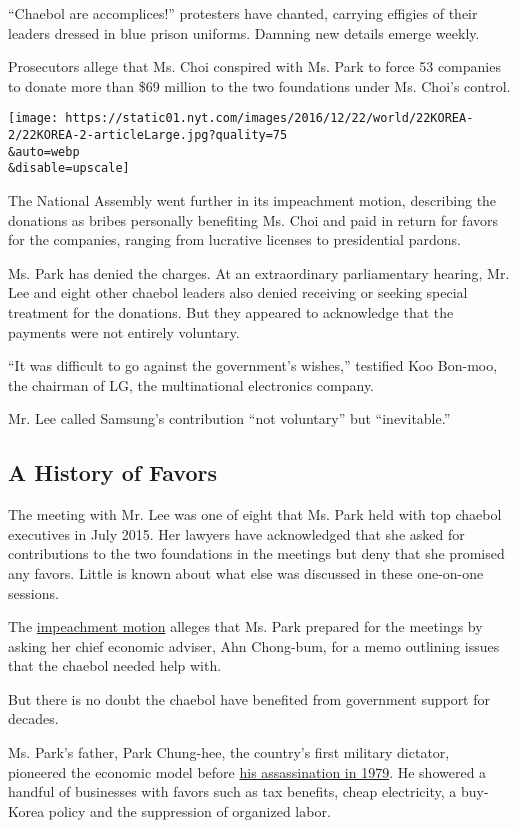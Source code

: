 ``Chaebol are accomplices!'' protesters have chanted, carrying effigies
of their leaders dressed in blue prison uniforms. Damning new details
emerge weekly.

Prosecutors allege that Ms. Choi conspired with Ms. Park to force 53
companies to donate more than \$69 million to the two foundations under
Ms. Choi's control.

\texttt{[image: https://static01.nyt.com/images/2016/12/22/world/22KOREA-2/22KOREA-2-articleLarge.jpg?quality=75\\\&auto=webp\\\&disable=upscale]}

The National Assembly went further in its impeachment motion, describing
the donations as bribes personally benefiting Ms. Choi and paid in
return for favors for the companies, ranging from lucrative licenses to
presidential pardons.

Ms. Park has denied the charges. At an extraordinary parliamentary
hearing, Mr. Lee and eight other chaebol leaders also denied receiving
or seeking special treatment for the donations. But they appeared to
acknowledge that the payments were not entirely voluntary.

``It was difficult to go against the government's wishes,'' testified
Koo Bon-moo, the chairman of LG, the multinational electronics company.

Mr. Lee called Samsung's contribution ``not voluntary'' but
``inevitable.''

\hypertarget{a-history-of-favors}{%
\subsection{A History of Favors}\label{a-history-of-favors}}

The meeting with Mr. Lee was one of eight that Ms. Park held with top
chaebol executives in July 2015. Her lawyers have acknowledged that she
asked for contributions to the two foundations in the meetings but deny
that she promised any favors. Little is known about what else was
discussed in these one-on-one sessions.

The
\href{https://www.nytimes.com/2016/12/08/world/asia/south-korea-park-geun-hye-accusations-impeachment.html}{impeachment
motion} alleges that Ms. Park prepared for the meetings by asking her
chief economic adviser, Ahn Chong-bum, for a memo outlining issues that
the chaebol needed help with.

But there is no doubt the chaebol have benefited from government support
for decades.

Ms. Park's father, Park Chung-hee, the country's first military
dictator, pioneered the economic model before
\href{http://www.nytimes.com/1979/11/04/archives/huge-crowd-mourns-park-at-funeral-rite-in-seoul.html}{his
assassination in 1979}. He showered a handful of businesses with favors
such as tax benefits, cheap electricity, a buy-Korea policy and the
suppression of organized labor.


